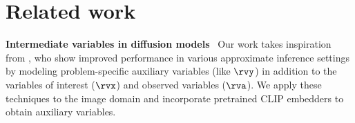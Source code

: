 













\section{Related work}
\textbf{Intermediate variables in diffusion models}~
 Our work takes inspiration from \citet{weilbach2022graphically}, %
who show improved performance in various approximate inference settings by modeling problem-specific auxiliary variables (like $\rvy$) in addition to the variables of interest ($\rvx$) and observed variables ($\rva$). We apply these techniques to the image domain and incorporate pretrained CLIP embedders to obtain auxiliary variables. 

